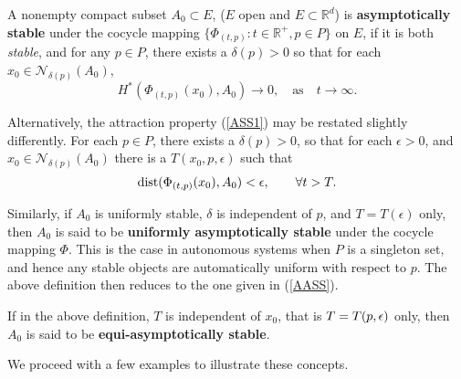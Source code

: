 \begin{defn}
   A nonempty compact subset $A_0 \subset E$, ($E$ open and $E \subset
   \mathbb{R}^d$) is {\bf asymptotically stable} under the cocycle mapping
   $\{ \Phi_{(t,p)} : t \in \mathbb{R}^+, p \in P\}$ on $E$, if it is
   both {\em stable}, and for any $p \in P$, there exists a $\delta(p)>0$
   so that for each $x_0 \in \mathcal{N}_{\delta(p)}(A_0)$,
\begin{equation}\label{ASS1}
   H^*(\Phi_{(t,p)}(x_0),A_0) \rightarrow 0,
            \quad \text{as} \quad t \rightarrow \infty.
   \end{equation}
\end{defn}
Alternatively, the attraction property (\ref{ASS1}) may be
restated slightly differently.  For each $p \in P$, there exists a
$\delta(p) > 0$, so that for each $\epsilon > 0$, and $x_0 \in
\mathcal{N}_{\delta(p)}(A_0)$ there is a $T(x_0, p, \epsilon)$
such that
\begin{equation}\label{ASS2}
   {\rm dist}(\Phi_{(t,p)}(x_0),A_0) < \epsilon, \qquad \forall t > T.
\end{equation}

Similarly, if $A_0$ is uniformly stable, $\delta$ is
independent of $p$, and $T=T(\epsilon)$ only, then $A_0$ is
said to be {\bf uniformly asymptotically stable} under the cocycle mapping
$\Phi$. This is the case in autonomous systems when $P$ is a singleton
set, and hence any stable objects are automatically uniform with respect
to $p$. The above definition then reduces to the one given in
(\ref{AASS}).

If in the above definition, $T$ is independent of $x_0$, that is
$T = T(p,\epsilon)$ only, then $A_0$ is said to be \textbf{
equi-asymptotically stable}.

We proceed with a few examples to illustrate these concepts.

